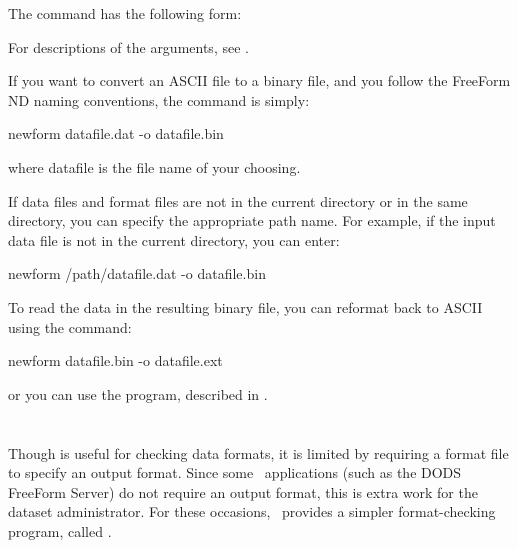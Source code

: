 The  command has the following form: 


For descriptions of the arguments, see .

If you want to convert an ASCII file to a binary file, and you follow
the FreeForm ND naming conventions, the command is simply:

\begin{example}
newform datafile.dat -o datafile.bin 
\end{example}

where datafile is the file name of your choosing. 

If data files and format files are not in the current directory or in
the same directory, you can specify the appropriate path name.  For
example, if the input data file is not in the current directory, you
can enter:

\begin{example}
newform /path/datafile.dat -o datafile.bin
\end{example}


To read the data in the resulting binary file, you can reformat back
to ASCII using the command:

\begin{example}
newform datafile.bin -o datafile.ext 
\end{example}

or you can use the  program, described in
. 



\section{}
\label{ff,chkform}


Though  is useful for checking data formats, it is
limited by requiring a format file to specify an output format.  Since
some \ffnd\ applications (such as the DODS FreeForm Server) do not
require an output format, this is extra work for the dataset
administrator.  For these occasions, \ffnd\ provides a simpler
format-checking program, called .

